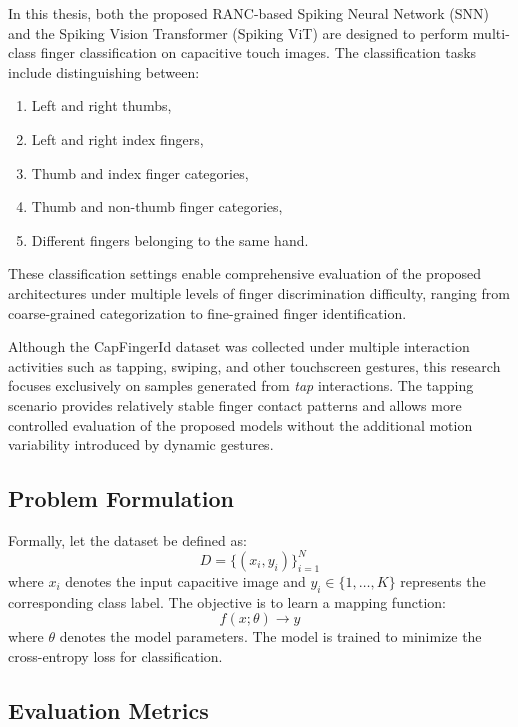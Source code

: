 \documentclass[../main.tex]{subfiles}
\begin{document}
In this thesis, both the proposed RANC-based Spiking Neural Network (SNN) and the Spiking Vision Transformer (Spiking ViT) are designed to perform multi-class finger classification on capacitive touch images. The classification tasks include distinguishing between:

\begin{enumerate}[label=\Roman*.]
    \item Left and right thumbs,
    \item Left and right index fingers,
    \item Thumb and index finger categories,
    \item Thumb and non-thumb finger categories,
    \item Different fingers belonging to the same hand.
\end{enumerate}

These classification settings enable comprehensive evaluation of the proposed architectures under multiple levels of finger discrimination difficulty, ranging from coarse-grained categorization to fine-grained finger identification.

Although the CapFingerId dataset was collected under multiple interaction activities such as tapping, swiping, and other touchscreen gestures, this research focuses exclusively on samples generated from \textit{tap} interactions. The tapping scenario provides relatively stable finger contact patterns and allows more controlled evaluation of the proposed models without the additional motion variability introduced by dynamic gestures.

\subsection{Problem Formulation}
Formally, let the dataset be defined as:
\begin{equation}
D = \{(x_i, y_i)\}_{i=1}^{N}
\end{equation}
where $x_i$ denotes the input capacitive image and $y_i \in \{1, \ldots, K\}$ represents the corresponding class label. The objective is to learn a mapping function:
\begin{equation}
f(x; \theta) \rightarrow y
\end{equation}
where $\theta$ denotes the model parameters. The model is trained to minimize the cross-entropy loss for classification.

\subsection{Evaluation Metrics}
\end{document}
